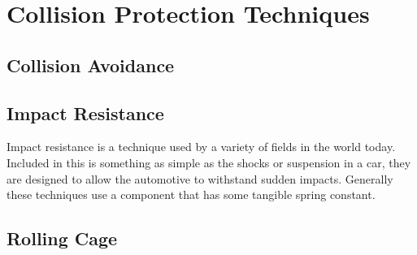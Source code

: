 \section{Collision Protection Techniques}
\cite{Klaptocz2013, Collision, Klaptocz2012, Briod2012, Daler2013, Klaptocz2010}
\subsection{Collision Avoidance}
\subsection{Impact Resistance}
Impact resistance is a technique used by a variety of fields in the world today. Included in this is something as simple as the shocks or suspension in a car, they are designed to allow the automotive to withstand sudden impacts. Generally these techniques use a component that has some tangible spring constant.


\subsection{Rolling Cage}
